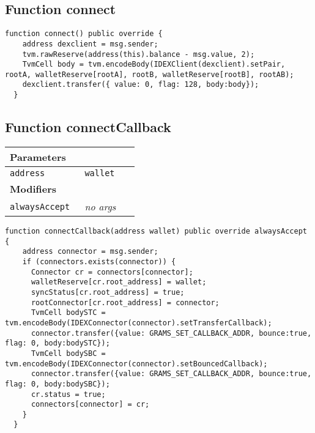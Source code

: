\subsection{Function connect}

\vspace{2cm}

\begin{lstlisting}[firstnumber=149]
  function connect() public override {
    address dexclient = msg.sender;
    tvm.rawReserve(address(this).balance - msg.value, 2);
    TvmCell body = tvm.encodeBody(IDEXClient(dexclient).setPair, rootA, walletReserve[rootA], rootB, walletReserve[rootB], rootAB);
    dexclient.transfer({ value: 0, flag: 128, body:body});
  }
\end{lstlisting}

\subsection{Function connectCallback}


\ifsoltables
\noindent\begin{tabular}{|l|l|p{5cm}|}\hline
\multicolumn{3}{|l|}{\bf Parameters}\\\hline
\tt address & \tt wallet &\\\hline
\multicolumn{3}{|l|}{\bf Modifiers}\\\hline
\tt alwaysAccept & {\em no args} &\\\hline
\end{tabular}
\fi

\vspace{2cm}

\begin{lstlisting}[firstnumber=132]
  function connectCallback(address wallet) public override alwaysAccept {
    address connector = msg.sender;
    if (connectors.exists(connector)) {
      Connector cr = connectors[connector];
      walletReserve[cr.root_address] = wallet;
      syncStatus[cr.root_address] = true;
      rootConnector[cr.root_address] = connector;
      TvmCell bodySTC = tvm.encodeBody(IDEXConnector(connector).setTransferCallback);
      connector.transfer({value: GRAMS_SET_CALLBACK_ADDR, bounce:true, flag: 0, body:bodySTC});
      TvmCell bodySBC = tvm.encodeBody(IDEXConnector(connector).setBouncedCallback);
      connector.transfer({value: GRAMS_SET_CALLBACK_ADDR, bounce:true, flag: 0, body:bodySBC});
      cr.status = true;
      connectors[connector] = cr;
    }
  }
\end{lstlisting}


